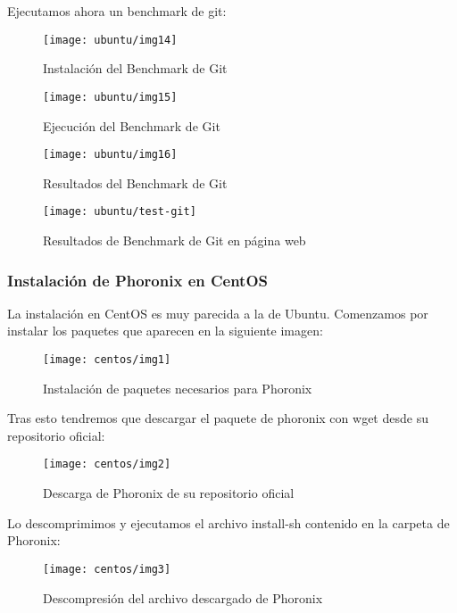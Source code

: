\newpage
Ejecutamos ahora un benchmark de git:

\begin{figure}[H]
    \centering
    \texttt{[image: ubuntu/img14]}
    \caption{Instalación del Benchmark de Git}
\end{figure}

\begin{figure}[H]
    \centering
    \texttt{[image: ubuntu/img15]}
    \caption{Ejecución del Benchmark de Git}
\end{figure}

\begin{figure}[H]
    \centering
    \texttt{[image: ubuntu/img16]}
    \caption{Resultados del Benchmark de Git}
\end{figure}

\begin{figure}[H]
    \centering
    \texttt{[image: ubuntu/test-git]}
    \caption{Resultados de Benchmark de Git en página web}
\end{figure}

\newpage
\subsubsection{Instalación de Phoronix en CentOS}

La instalación en CentOS es muy parecida a la de Ubuntu. Comenzamos por instalar los paquetes que aparecen en la siguiente imagen:

\begin{figure}[H]
    \centering
    \texttt{[image: centos/img1]}
    \caption{Instalación de paquetes necesarios para Phoronix}
\end{figure}

Tras esto tendremos que descargar el paquete de phoronix con wget desde su repositorio oficial:

\begin{figure}[H]
    \centering
    \texttt{[image: centos/img2]}
    \caption{Descarga de Phoronix de su repositorio oficial}
\end{figure}

\newpage
Lo descomprimimos y ejecutamos el archivo install-sh contenido en la carpeta de Phoronix:

\begin{figure}[H]
    \centering
    \texttt{[image: centos/img3]}
    \caption{Descompresión del archivo descargado de Phoronix}
\end{figure}

